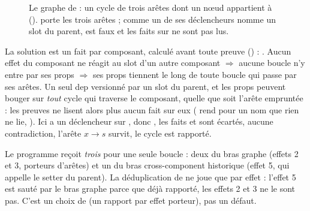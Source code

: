 \begin{figure}[htbp]\centering
{}
\caption{Le graphe de  : un cycle de trois arêtes  dont un nœud appartient à  ().  porte les trois arêtes ; comme un de ses déclencheurs nomme un slot du parent,  est faux et les faits sur  ne sont pas lus.}
\label{fig:churn-props-move}
\end{figure}

La solution est un fait par composant, calculé avant toute preuve
() :
. Aucun effet du
composant ne réagit au slot d'un autre composant $\Rightarrow$ aucune boucle n'y entre par
ses props $\Rightarrow$ ses props tiennent le long de toute boucle qui passe par ses arêtes.
Un seul dep versionné par un slot du parent, et les props peuvent bouger sur \emph{tout}
cycle qui traverse le composant, quelle que soit l'arête empruntée : les preuves ne lisent
alors plus aucun fait sur eux ( rend  pour un
nom que rien ne lie, ). Ici  a un
déclencheur sur , donc , les faits  et
 sont écartés, aucune contradiction, l'arête $x \to s$ survit, le cycle est
rapporté.

\begin{remarque}
Le programme reçoit \emph{trois} \Warning{} pour une seule boucle : deux du bras graphe
(effets 2 et 3, porteurs d'arêtes) et un du bras cross-component historique (effet 5, qui
appelle le setter du parent). La déduplication de 
ne joue que par effet : l'effet 5 est sauté par le bras graphe parce que déjà rapporté, les
effets 2 et 3 ne le sont pas. C'est un choix de  (\og un rapport par effet
porteur\fg), pas un défaut.
\end{remarque}

